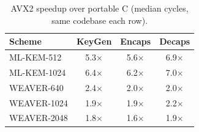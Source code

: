 \begin{table}[t]
\centering
\caption{AVX2 speedup over portable C (median cycles, same codebase each row).}
\label{tab:avx_speedup_both}
\renewcommand{\arraystretch}{1.15}
\begin{tabular}{lccc}
\toprule
\textbf{Scheme} & \textbf{KeyGen} & \textbf{Encaps} & \textbf{Decaps} \\
\midrule
ML-KEM-512   & 5.3$\times$ & 5.6$\times$ & 6.9$\times$ \\
ML-KEM-1024  & 6.4$\times$ & 6.2$\times$ & 7.0$\times$ \\
\textsc{WEAVER-640}   & 2.4$\times$ & 2.0$\times$ & 2.0$\times$ \\
\textsc{WEAVER-1024}  & 1.9$\times$ & 1.9$\times$ & 2.2$\times$ \\
\textsc{WEAVER-2048}  & 1.8$\times$ & 1.6$\times$ & 1.9$\times$ \\
\bottomrule
\end{tabular}
\end{table}

